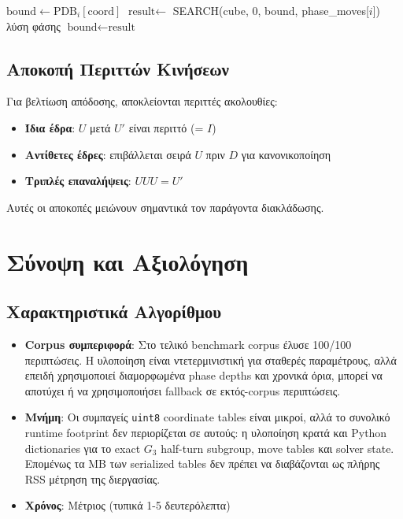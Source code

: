 \begin{algorithm}[H]
\caption{IDA* για φάση $i$}
\begin{algorithmic}[1]
\State $\text{bound} \gets \text{PDB}_i[\text{coord}]$
\Loop
    \State $\text{result} \gets$ SEARCH(cube, 0, bound, phase\_moves[$i$])
        \State \Return λύση φάσης
    \EndIf
    \State $\text{bound} \gets \text{result}$
\EndLoop
\end{algorithmic}
\end{algorithm}

\subsection{Αποκοπή Περιττών Κινήσεων}

Για βελτίωση απόδοσης, αποκλείονται περιττές ακολουθίες:
\begin{itemize}
    \item \textbf{Ίδια έδρα}: $U$ μετά $U'$ είναι περιττό (= $I$)
    \item \textbf{Αντίθετες έδρες}: επιβάλλεται σειρά $U$ πριν $D$ για κανονικοποίηση
    \item \textbf{Τριπλές επαναλήψεις}: $U U U = U'$
\end{itemize}

Αυτές οι αποκοπές μειώνουν σημαντικά τον παράγοντα διακλάδωσης.


\section{Σύνοψη και Αξιολόγηση}
\label{sec:thistlethwaite_summary}

\subsection{Χαρακτηριστικά Αλγορίθμου}

\begin{itemize}
    \item \textbf{Corpus συμπεριφορά}: Στο τελικό benchmark corpus έλυσε 100/100 περιπτώσεις. Η υλοποίηση είναι ντετερμινιστική για σταθερές παραμέτρους, αλλά επειδή χρησιμοποιεί διαμορφωμένα phase depths και χρονικά όρια, μπορεί να αποτύχει ή να χρησιμοποιήσει fallback σε εκτός-corpus περιπτώσεις.
    \item \textbf{Μνήμη}: Οι συμπαγείς \texttt{uint8} coordinate tables είναι μικροί, αλλά το συνολικό runtime footprint δεν περιορίζεται σε αυτούς: η υλοποίηση κρατά και Python dictionaries για το exact $G_3$ half-turn subgroup, move tables και solver state. Επομένως τα MB των serialized tables δεν πρέπει να διαβάζονται ως πλήρης RSS μέτρηση της διεργασίας.
    \item \textbf{Χρόνος}: Μέτριος (τυπικά 1-5 δευτερόλεπτα)
\end{itemize}

